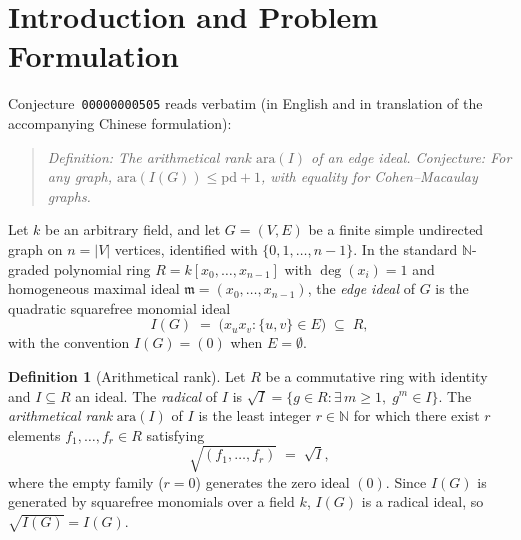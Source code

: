 \documentclass[11pt,a4paper]{amsart}
\theoremstyle{plain}
\theoremstyle{definition}
\newtheorem{definition}[theorem]{Definition}
\newcommand{\ara}{\mathrm{ara}}
\newcommand{\pd}{\mathrm{pd}}
\newcommand{\mm}{\mathfrak{m}}
\begin{document}
\maketitle

\section{Introduction and Problem Formulation}

 Conjecture~\texttt{00000000505} reads verbatim (in English and in translation of the accompanying Chinese formulation):
\begin{quote}
\emph{Definition: The arithmetical rank $\ara(I)$ of an edge ideal. Conjecture: For any graph, $\ara(I(G)) \le \pd + 1$, with equality for Cohen--Macaulay graphs.}
\end{quote}

Let $k$ be an arbitrary field, and let $G = (V, E)$ be a finite simple undirected graph on $n = |V|$ vertices, identified with $\{0, 1, \dots, n-1\}$. In the standard $\mathbb{N}$-graded polynomial ring $R = k[x_0, \dots, x_{n-1}]$ with $\deg(x_i) = 1$ and homogeneous maximal ideal $\mm = (x_0, \dots, x_{n-1})$, the \emph{edge ideal} of $G$ is the quadratic squarefree monomial ideal
\[
  I(G) \;=\; \bigl( x_u x_v : \{u, v\} \in E \bigr) \;\subseteq\; R,
\]
with the convention $I(G) = (0)$ when $E = \emptyset$.

\begin{definition}[Arithmetical rank]
Let $R$ be a commutative ring with identity and $I \subseteq R$ an ideal. The \emph{radical} of $I$ is $\sqrt{I} = \{g \in R : \exists\, m \ge 1,\; g^m \in I\}$. The \emph{arithmetical rank} $\ara(I)$ of $I$ is the least integer $r \in \mathbb{N}$ for which there exist $r$ elements $f_1, \dots, f_r \in R$ satisfying
\[
  \sqrt{(f_1, \dots, f_r)} \;=\; \sqrt{I},
\]
where the empty family ($r = 0$) generates the zero ideal $(0)$. Since $I(G)$ is generated by squarefree monomials over a field $k$, $I(G)$ is a radical ideal, so $\sqrt{I(G)} = I(G)$.
\end{definition}
\end{document}
